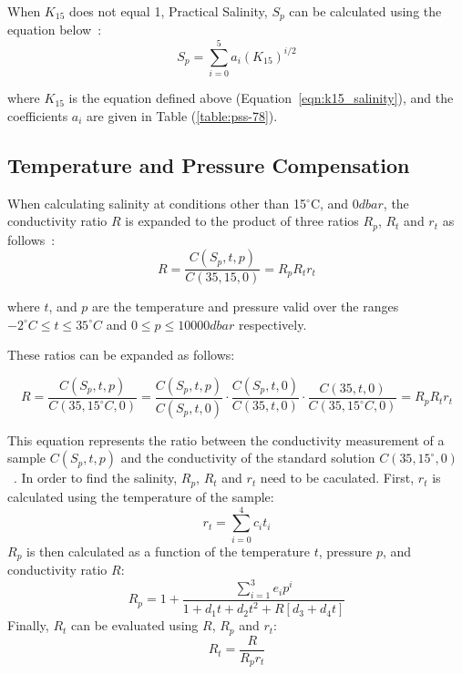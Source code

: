 When $K_{15}$ does not equal 1, Practical Salinity, $S_p$ can be calculated using the equation below~\cite{teos-10}: 
\begin{equation}\label{eqn:salinity_short}
    S_p = \sum_{i=0}^{5}a_i{(K_{15})}^{i/2} 
\end{equation}

where $K_{15}$ is the equation defined above (Equation~\ref{eqn:k15_salinity}), and the coefficients $a_i$ are given in Table (\ref{table:pss-78}).


\subsection{Temperature and Pressure Compensation}\label{sec:salinity_compensation}
When calculating salinity at conditions other than 15$^\circ$C, and $0dbar$, the conductivity ratio $R$ is expanded to the product of three ratios $R_p$, $R_t$ and $r_t$ as follows~\cite{teos-10}:
\begin{equation}
    R=\frac{C(S_p, t, p)}{C(35, 15, 0)} = R_p R_t r_t
\end{equation}

where $t$, and $p$ are the temperature and pressure valid over the ranges $-2^{\circ}C \leq t \leq 35^{\circ}C$ and $0 \leq p \leq 10 000dbar$ respectively.

These ratios can be expanded as follows:

\begin{equation}
    R = \frac{C(S_p, t, p)}{C(35, 15^{\circ} C, 0)} = \frac{C(S_p, t, p)}{C(S_p, t, 0)} \cdot \frac{C(S_p, t, 0)}{C(35, t, 0)} \cdot \frac{C(35, t, 0)}{C(35, 15^{\circ} C, 0)} = R_p R_t r_t
\end{equation}

This equation represents the ratio between the conductivity measurement of a sample $C(S_p,t,p)$ and the conductivity of the standard solution $C(35, 15^{\circ}, 0)$~\cite{teos-10}. 
In order to find the salinity, $R_p$, $R_t$ and $r_t$ need to be caculated.
First, $r_t$ is calculated using the temperature of the sample:
\begin{equation}
    r_t = \sum_{i=0}^{4} {c_i}{t_i}
\end{equation}
$R_p$ is then calculated as a function of the temperature $t$, pressure $p$, and conductivity ratio $R$:
\begin{equation}
    R_p = 1 + \frac{\sum_{i=1}^{3}{e_i}{p^i}}{1+d_1{t}+d_2{t^2}+R[d_3+d_4 {t}]}
\end{equation}
Finally, $R_t$ can be evaluated using $R$, $R_p$ and $r_t$:
\begin{equation}
    R_t = \frac{R}{{R_p}{r_t}}
\end{equation} 

